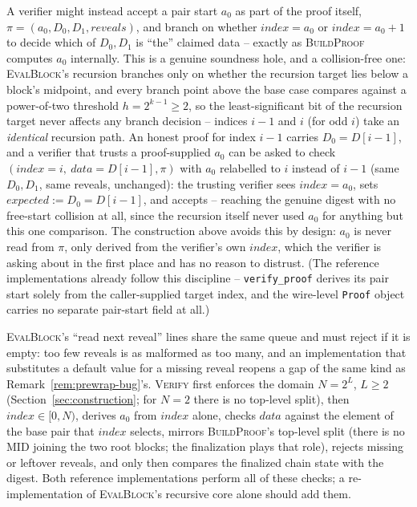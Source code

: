 \begin{remark}
\label{rem:a0-bug}
A verifier might instead accept a pair start $a_0$ as part of the proof
itself, $\pi = (a_0, D_0, D_1, \mathit{reveals})$, and branch on whether
$\mathit{index} = a_0$ or $\mathit{index} = a_0+1$ to decide which of
$D_0, D_1$ is ``the'' claimed data -- exactly as \textsc{BuildProof}
computes $a_0$ internally. This is a genuine soundness hole, and a
collision-free one: \textsc{EvalBlock}'s recursion branches only on
whether the recursion target lies below a block's midpoint, and every
branch point above the base case compares against a power-of-two
threshold $h = 2^{k-1} \ge 2$, so the least-significant bit of the
recursion target never affects any branch decision -- indices $i-1$ and
$i$ (for odd $i$) take an \emph{identical} recursion path. An honest
proof for index $i-1$ carries $D_0 = D[i-1]$, and a verifier that trusts a
proof-supplied $a_0$ can be asked to check $(\mathit{index}=i,\
\mathit{data}=D[i-1], \pi)$ with $a_0$ relabelled to $i$ instead of $i-1$
(same $D_0, D_1$, same reveals, unchanged): the trusting verifier sees
$\mathit{index}=a_0$, sets $\mathit{expected} := D_0 = D[i-1]$, and
accepts -- reaching the genuine digest with no free-start collision at
all, since the recursion itself never used $a_0$ for anything but this one
comparison. The construction above avoids this by design: $a_0$ is never
read from $\pi$, only derived from the verifier's own $\mathit{index}$,
which the verifier is asking about in the first place and has no reason
to distrust. (The reference implementations already follow this
discipline -- \texttt{verify\_proof} derives its pair start solely from
the caller-supplied target index, and the wire-level \texttt{Proof} object
carries no separate pair-start field at all.)
\end{remark}

\textsc{EvalBlock}'s ``read next reveal'' lines share the same queue and
must reject if it is empty: too few reveals is as malformed as too many,
and an implementation that substitutes a default value for a missing
reveal reopens a gap of the same kind as Remark~\ref{rem:prewrap-bug}'s.
\textsc{Verify} first enforces the domain $N = 2^L$, $L \ge 2$
(Section~\ref{sec:construction}; for $N=2$ there is no top-level split),
then $\mathit{index} \in [0,N)$, derives $a_0$ from $\mathit{index}$
alone, checks $\mathit{data}$ against the element of the base pair that
$\mathit{index}$ selects, mirrors \textsc{BuildProof}'s top-level split
(there is no $\mathrm{MID}$ joining the two root blocks; the finalization
plays that role), rejects missing or leftover reveals, and only then
compares the finalized chain state with the digest. Both reference
implementations perform all of these checks; a re-implementation of
\textsc{EvalBlock}'s recursive core alone should add them.

